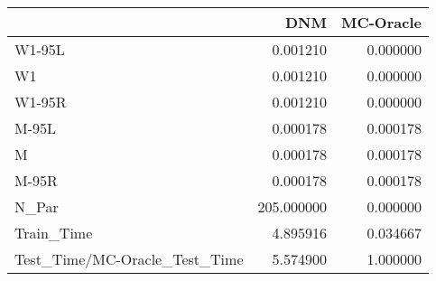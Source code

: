 \begin{tabular}{lrr}
\toprule
{} &         DNM &  MC-Oracle \\
\midrule
W1-95L                        &    0.001210 &   0.000000 \\
W1                            &    0.001210 &   0.000000 \\
W1-95R                        &    0.001210 &   0.000000 \\
M-95L                         &    0.000178 &   0.000178 \\
M                             &    0.000178 &   0.000178 \\
M-95R                         &    0.000178 &   0.000178 \\
N\_Par                         &  205.000000 &   0.000000 \\
Train\_Time                    &    4.895916 &   0.034667 \\
Test\_Time/MC-Oracle\_Test\_Time &    5.574900 &   1.000000 \\
\bottomrule
\end{tabular}
